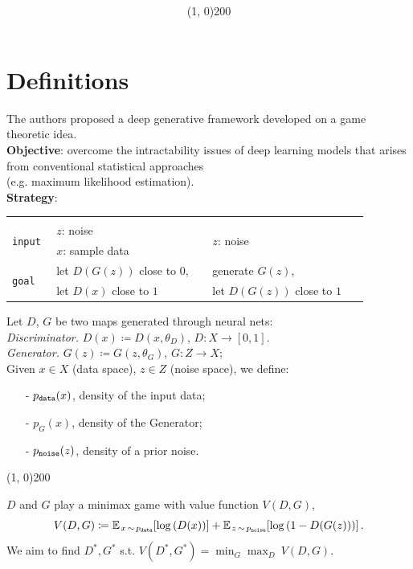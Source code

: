 \documentclass{beamer}
\title[\scshape{\thetitle}]{\large\scshape{\thetitle}}
\subtitle{\texorpdfstring{\vspace{-0.3cm}\line(1, 0){200}\\\thesubtitle}{\thesubtitle}}
\author[\scshape{\theauthor}]{\small\scshape{\theauthor}}
\institute[\scshape{\thedate}]{\theinstitute}
\date{\footnotesize\thedate}
\newcommand{\firstpage}{
					\begingroup
						\setbeamertemplate{headline}{}
						\frame{
							\titlepage
						}
					\endgroup
				}
\begin{document}
	\firstpage

	\section{Definitions}

	\begin{frame}
		The authors proposed a deep generative framework developed on a game theoretic idea. \\
		\medskip
		\textbf{Objective}: overcome the intractability issues of deep learning models that arises from conventional statistical approaches \\
		(e.g. maximum likelihood estimation). \\
		\medskip
		\textbf{Strategy}: 
		\begin{center}
			\begin{tabular}{ p{0.1\linewidth} | p{0.39\linewidth} | p{0.39\linewidth}}
				& \centering{Discriminator $D$} & \centering{Generator $G$} \tabularnewline [0.3cm]
				\multirow{2}{*}{\texttt{input}} & $z$: noise & \multirow{2}{*}{$z$: noise} \tabularnewline
				& $x$: sample data & \tabularnewline [0.3cm]
				\multirow{2}{*}{\texttt{goal}} & let $D(G(z))$ close to $0$, & generate $G(z)$, \tabularnewline
				& let $D(x)$ close to $1$ & let $D(G(z))$ close to $1$ 
			\end{tabular}
		\end{center}
	\end{frame}

	\begin{frame}
		Let $D$, $G$ be two maps generated through neural nets: \\
		\smallskip
		\hspace{20pt}\textit{Discriminator.} $D(x) \coloneqq D(x, \theta_D)$, $D: X \to [0, 1]$. \\
		\hspace{20pt}\textit{Generator.} $G(z) \coloneqq G(z, \theta_G)$, $G: Z \to X$; \\
		\medskip
		Given $x \in X$ (data space), $z \in Z$ (noise space), we define:
		\begin{itemize}
			\item[-] $p_\text{\texttt{data}}(x)$, density of the input data;
			\item[-] $p_G(x)$, density of the Generator;
			\item[-] $p_\text{\texttt{noise}}(z)$, density of a prior noise. 
		\end{itemize}
		\vspace{-0.2cm}
		\begin{center} \line(1, 0){200} \end{center}
		\vspace{-0cm}
		$D$ and $G$ play a minimax game with value function $V(D, G)$,
		\begin{equation*}
			V(D, G) \coloneqq \mean[x \sim p_\text{\texttt{data}}]{\log{D(x)}} + \mean[z \sim p_\text{\texttt{noise}}]{\log{1 - D(G(z))}}.
		\end{equation*}
		We aim to find $D^*, G^*$ s.t. $V(D^*, G^*) = \min_G \max_D \ V(D, G)$.
	\end{frame}
\end{document}
